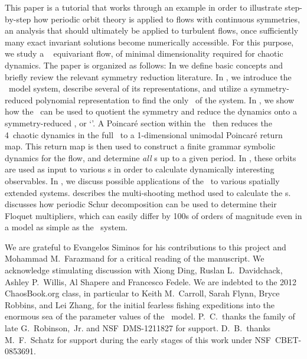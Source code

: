 \documentclass[aip,cha,
reprint,
secnumarabic,
nofootinbib, tightenlines,
nobibnotes, showkeys, showpacs,
superscriptaddress,
]{revtex4-1}
\begin{document}
This paper is a tutorial that works through an example in order to
illustrate step-by-step how periodic orbit theory is applied to flows
with continuous symmetries, an analysis that should ultimately be applied
to turbulent flows, once sufficiently many exact invariant solutions
become numerically accessible. For this purpose, we study a \twomode\
 equivariant flow, of minimal dimensionality required for chaotic
dynamics. The paper is organized as follows: In \refsect{s:symm} we
define basic concepts and briefly review the relevant symmetry reduction
literature. In \refsect{s:twoMode}, we introduce the \twomode\ model
system, describe several of its representations, and utilize a
symmetry-reduced polynomial representation to find the only \reqv\ of the
system. In \refsect{s:numerics}, we show how the \mslices\ can be used to
quotient the symmetry and reduce the dynamics onto a symmetry-reduced
\statesp, or `\slice'. A Poincar\'e section within the \slice\ then
reduces the 4\dmn\ chaotic dynamics in the full \statesp\ to a
1-dimensional unimodal Poincar\'e return map. This return map is then
used to construct a finite grammar symbolic dynamics for the flow, and
determine {\em all} \rpo s up to a given period. In ,
these orbits are used as input to various {\cycForm s} in order to calculate
dynamically interesting observables. In \refsect{s:concl},
we discuss possible applications of the \mslices\ to various spatially
extended systems.
 describes the multi-shooting method used to calculate
the \rpo s.
 discusses how periodic Schur decomposition can be used
to determine their Floquet multipliers, which can easily differ by 100s
of orders of magnitude even in a model as simple as the \twomode\ system.










\begin{acknowledgments}
We are grateful to Evangelos Siminos for his contributions to this project
and Mohammad M.~Farazmand for a critical reading of the manuscript.
We acknowledge stimulating discussion with
Xiong Ding,
Ruslan L.~Davidchack,
Ashley P.~Willis,
Al Shapere
and
Francesco Fedele.
We are indebted to the 2012 ChaosBook.org class, in particular to
Keith M.~Carroll,
Sarah Flynn,
Bryce Robbins,
and
Lei Zhang,
for the initial fearless fishing expeditions into the enormous sea of the
parameter values of the \twomode\ model.
P.~C.\ thanks the family of late G.~Robinson,~Jr.
and
NSF~DMS-1211827 for support. D.~B.\ thanks M.~F.\ Schatz for support during
the early stages of this work under NSF~CBET-0853691.
\end{acknowledgments}
\end{document}
